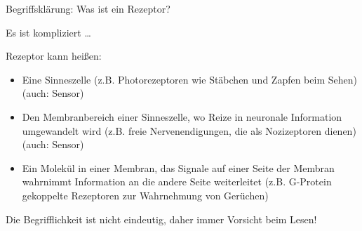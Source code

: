 \documentclass[aspectratio=169]{beamer}
\begin{document}



\begin{frame}{Begriffsklärung: Was ist ein Rezeptor?}

Es ist kompliziert \dots 

Rezeptor kann heißen: 

\begin{itemize}
    \item 
    Eine Sinneszelle (z.B. Photorezeptoren wie Stäbchen und Zapfen beim Sehen) (auch: Sensor)
    \item
    Den Membranbereich einer Sinneszelle, wo Reize in neuronale Information umgewandelt wird (z.B. freie Nervenendigungen, die als Nozizeptoren dienen) (auch: Sensor)
    \item
    Ein Molekül in einer Membran, das Signale auf einer Seite der Membran wahrnimmt Information an die andere Seite weiterleitet (z.B. G-Protein gekoppelte Rezeptoren zur Wahrnehmung von Gerüchen) 
\end{itemize}
    
Die Begrifflichkeit ist nicht eindeutig, daher immer Vorsicht beim Lesen!  

    

\end{frame}






\end{document}
